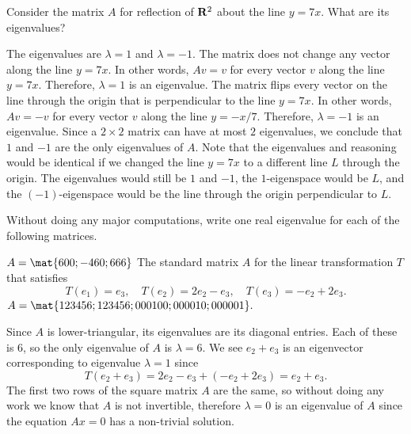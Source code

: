 \begin{problems}
\problem %
Consider the matrix $A$ for reflection of ${\bf R}^2$ about the line $y = 7x$.
What are its eigenvalues?

\begin{solution}
  The eigenvalues are $\lambda = 1$ and $\lambda = -1$.  The matrix does not
  change any vector along the line $y = 7x$.  In other words, $Av = v$ for every
  vector $v$ along the line $y = 7x$. Therefore, $\lambda = 1$ is an eigenvalue.
  \newline \newline %
  The matrix flips every vector on the line through the origin that is
  perpendicular to the line $y = 7x$.  In other words, $Av = -v$ for every
  vector $v$ along the line $y = -x/7$.  Therefore, $\lambda = -1$ is an
  eigenvalue. \newline \newline %
  Since a $2 \times 2$ matrix can have at most $2$ eigenvalues, we conclude that
  $1$ and $-1$ are the only eigenvalues of $A$. \newline \newline %
  Note that the eigenvalues and reasoning would be identical if we changed the
  line $y = 7x$ to a different line $L$ through the origin.  The eigenvalues
  would still be $1$ and $-1$, the $1$-eigenspace would be $L$, and the
  $(-1)$-eigenspace would be the line through the origin perpendicular to $L$.
  
\end{solution}


\problem
Without doing any major computations, write one real eigenvalue for
each of the following matrices. 
\begin{subproblems}
  \subproblem $A = \mat{6 0 0; -4 6 0; 6 6 6}$ \subproblem The
  standard matrix $A$ for the linear transformation $T$ that satisfies
  \[T(e_1) = e_3, \quad T(e_2) = 2e_2 - e_3, \quad T(e_3) = -e_2
    +2e_3.\]
  \subproblem
  $A = \mat{1 2 3 4 5 6; 1 2 3 4 5 6; 0 0 0 1 0 0; 0 0 0 0 1 0; 0 0 0
    0 0 1}.$
\end{subproblems}

\begin{solution}
  \begin{subproblems}
    \subproblem Since $A$ is lower-triangular, its eigenvalues are its
    diagonal entries.  Each of these is $6$, so the only eigenvalue of
    $A$ is $\lambda = 6$.
    \subproblem We see $e_2+e_3$ is an eigenvector corresponding to
    eigenvalue $\lambda = 1$ since
    \[T(e_2+e_3) = 2e_2-e_3 + (-e_2 + 2e_3) = e_2 + e_3.\]
    \subproblem The first two rows of the square matrix $A$ are the
    same, so without doing any work we know that $A$ is not invertible,
    therefore $\lambda = 0$ is an eigenvalue of $A$ since the equation
    $Ax = 0$ has a non-trivial solution.


\end{subproblems}
\end{solution}
\end{problems}
